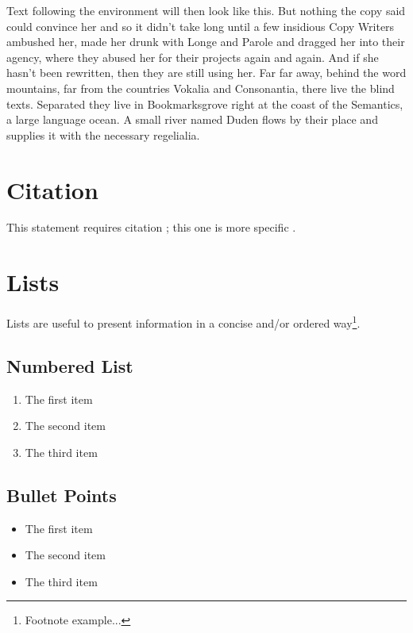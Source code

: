 	Text following the environment will then look like this. But nothing the copy said could convince her and so it didn’t take long until a few insidious Copy Writers ambushed her, made her drunk with Longe and Parole and dragged her into their agency, where they abused her for their projects again and again. And if she hasn’t been rewritten, then they are still using her. Far far away, behind the word mountains, far from the countries Vokalia and Consonantia, there live the blind texts. Separated they live in Bookmarksgrove right at the coast of the Semantics, a large language ocean. A small river named Duden flows by their place and supplies it with the necessary regelialia. 
	
	
	\section{Citation}
	
	This statement requires citation \cite{book_key}; this one is more specific \cite[122]{article_key}.
	
	
	\section{Lists}
	
	Lists are useful to present information in a concise and/or ordered way\footnote{Footnote example...}.
	
	\subsection{Numbered List}
	
	\begin{enumerate}
		\item The first item
		\item The second item
		\item The third item
	\end{enumerate}
	
	\subsection{Bullet Points}
	
	\begin{itemize}
		\item The first item
		\item The second item
		\item The third item
	\end{itemize}
	
